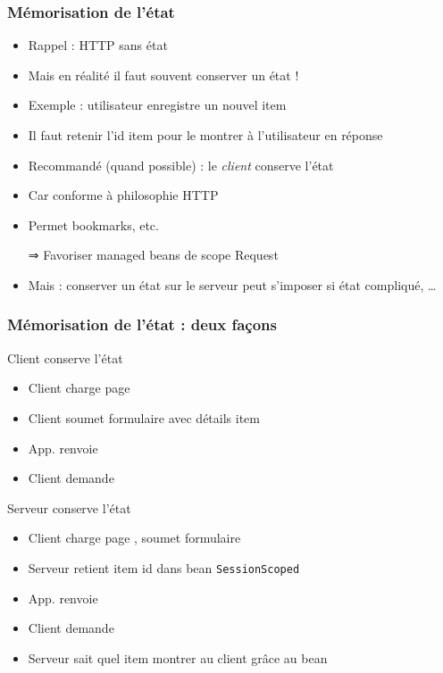 \documentclass[english, french]{beamer}
\begin{document}
\begin{frame}
	\frametitle{Mémorisation de l’état}
	\begin{itemize}
		\item Rappel : HTTP sans état
		\item Mais en réalité il faut souvent conserver un état !
		\item Exemple : utilisateur enregistre un nouvel item
		\item Il faut retenir l’id item pour le montrer à l’utilisateur en réponse
		\item Recommandé (quand possible) : le \emph{client} conserve l’état
		\item Car conforme à philosophie HTTP
		\item Permet bookmarks, etc.
		\item[⇒] Favoriser managed beans de scope Request
		\item Mais : conserver un état sur le serveur peut s’imposer si état compliqué, …
	\end{itemize}
\end{frame}

\begin{frame}
	\frametitle{Mémorisation de l’état : deux façons}
	\begin{exampleblock}{Client conserve l’état}
		\begin{itemize}
			\item Client charge page 
			\item Client soumet formulaire avec détails item
			\item App. renvoie {\footnotesize{}}
			\item Client demande 
		\end{itemize}
	\end{exampleblock}
	\begin{exampleblock}{Serveur conserve l’état}
		\begin{itemize}
			\item Client charge page , soumet formulaire
			\item Serveur retient item id dans bean \texttt{SessionScoped}
			\item App. renvoie 
			\item Client demande 
			\item Serveur sait quel item montrer au client grâce au bean\vspace{-2pt}
		\end{itemize}
	\end{exampleblock}
\end{frame}
\end{document}
